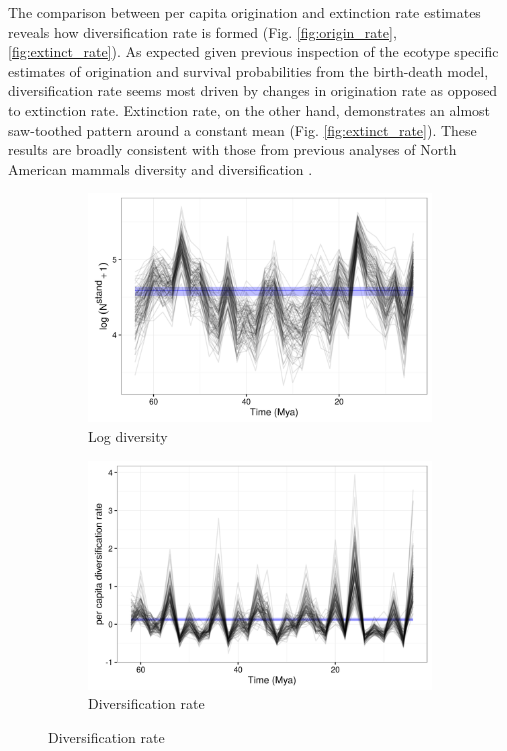 \documentclass[12pt,letterpaper]{article}
\begin{document}
The comparison between per capita origination and extinction rate estimates reveals how diversification rate is formed (Fig. \ref{fig:origin_rate}, \ref{fig:extinct_rate}). As expected given previous inspection of the ecotype specific estimates of origination and survival probabilities from the birth-death model, diversification rate seems most driven by changes in origination rate as opposed to extinction rate. Extinction rate, on the other hand, demonstrates an almost saw-toothed pattern around a constant mean (Fig. \ref{fig:extinct_rate}). These results are broadly consistent with those from previous analyses of North American mammals diversity and diversification \citep{Alroy1996a,Alroy2000g,Alroy2009}.


\begin{figure}[ht]
  \begin{subfigure}[b]{0.45\textwidth}
    \includegraphics[width=\textwidth,height=0.4\textheight,keepaspectratio=true]{figure/log_diversity}
    \caption{Log diversity}
    \label{fig:diversity_est}
  \end{subfigure}
  \begin{subfigure}[b]{0.45\textwidth}
    \includegraphics[width=\textwidth,height=0.4\textheight,keepaspectratio=true]{figure/div_rate}
    \caption{Diversification rate}
    \label{fig:diversity_rate}
  \end{subfigure}


\end{figure}
\end{document}
